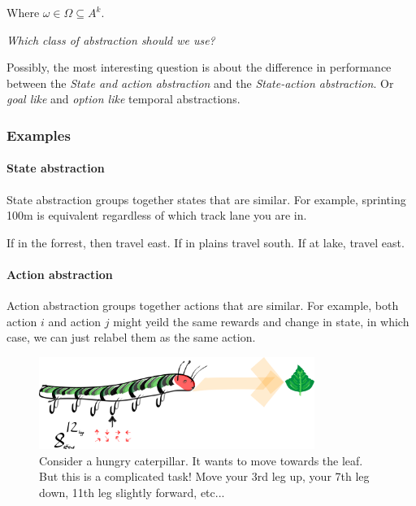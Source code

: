 

Where $\omega \in \Omega \subseteq A^k$.



\begin{displayquote}
\textit{Which class of abstraction should we use?}
\end{displayquote}

Possibly, the most interesting question is about the difference in performance between
the \textit{State and action abstraction} and the \textit{State-action abstraction}.
Or \textit{goal like} and \textit{option like} temporal abstractions.

\subsubsection{Examples}

\paragraph{State abstraction}

State abstraction groups together states that are similar. For example,
sprinting 100m is equivalent regardless of which track lane you are in.

If in the forrest, then travel east. If in plains travel south. If at lake, travel east.


\paragraph{Action abstraction}

Action abstraction groups together actions that are similar. For
example, both action $i$ and action $j$ might yeild the same rewards and change in state,
in which case, we can just relabel them as the same action.

\begin{figure}[h!]
\centering
\includegraphics[width=0.8\textwidth,height=0.2\textheight]{../../pictures/drawings/hungry-caterpillar.png}
\caption{Consider a hungry caterpillar. It wants to move towards the leaf. But this is a complicated task! Move your 3rd leg up, your 7th leg down, 11th leg slightly forward, etc...}
\end{figure}


